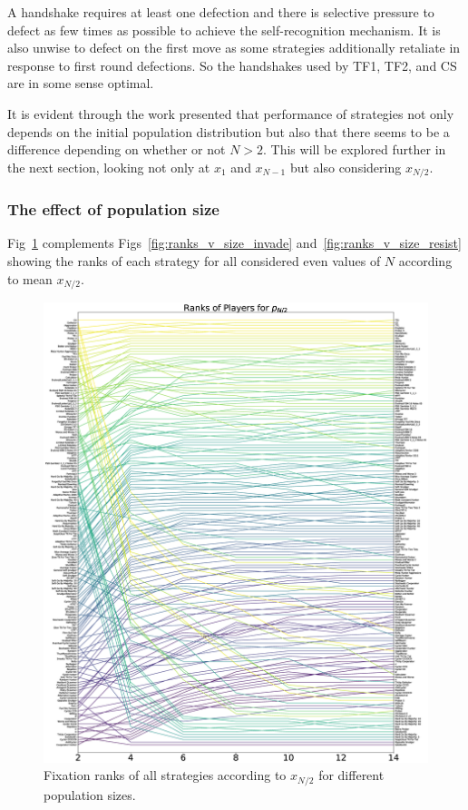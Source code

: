 \documentclass[10pt,letterpaper]{article}
\begin{document}
A handshake requires at least one defection and there is
selective pressure to defect as few times as possible to achieve the
self-recognition mechanism. It is also unwise to defect on the first move as
some strategies additionally retaliate in response to first round defections. So the
handshakes used by TF1, TF2, and CS are in some sense optimal.

It is evident through
the work presented that performance of strategies not only depends
on the initial population distribution but also that there seems to be a
difference depending on whether or not \(N>2\). This will be explored further in
the next section, looking not only at \(x_1\) and \(x_{N-1}\) but also
considering
\(x_{N/2}\).

\subsubsection*{The effect of population size}

Fig~\ref{fig:ranks_v_size_coexist} complements
Figs~\ref{fig:ranks_v_size_invade} and~\ref{fig:ranks_v_size_resist} showing the
ranks of each strategy for all considered even values of \(N\) according to mean
\(x_{N/2}\).

\begin{figure}[!hbtp]
    \centering
    \includegraphics[draft, width=\columnwidth]{./Fig5.eps}
    \caption{Fixation ranks of all strategies according to \(x_{N/2}\) for different
    population sizes.}
    \label{fig:ranks_v_size_coexist}
\end{figure}
\end{document}
